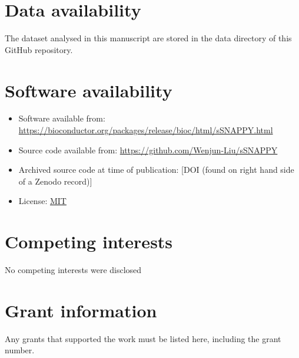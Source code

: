 \documentclass[9pt,a4paper,]{extarticle}
\begin{document}
\hypertarget{data-availability}{%
\section{Data availability}\label{data-availability}}

The dataset analysed in this manuscript are stored in the data directory of this GitHub repository.

\hypertarget{software-availability}{%
\section{Software availability}\label{software-availability}}

\begin{itemize}
\item
  Software available from: \url{https://bioconductor.org/packages/release/bioc/html/sSNAPPY.html}
\item
  Source code available from: \url{https://github.com/Wenjun-Liu/sSNAPPY}
\item
  Archived source code at time of publication: {[}DOI (found on right hand side of a Zenodo record){]}
\item
  License: \href{https://opensource.org/license/mit/}{MIT}
\end{itemize}

\hypertarget{competing-interests}{%
\section{Competing interests}\label{competing-interests}}

No competing interests were disclosed

\hypertarget{grant-information}{%
\section{Grant information}\label{grant-information}}

Any grants that supported the work must be listed here, including the grant number.

\renewcommand\refname{Acknowledgements}
{\small}
\end{document}
